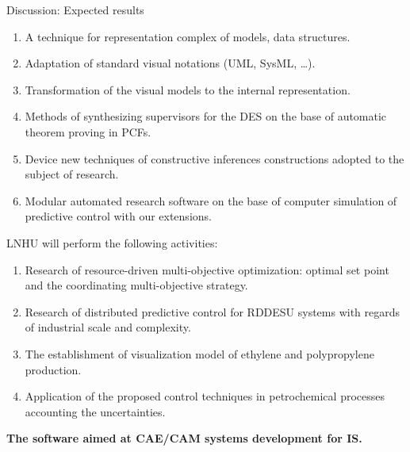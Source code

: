 \documentclass[10pt,dvipsnames]{beamer}
\begin{document}
\begin{frame}{Discussion: Expected results}
\begin{enumerate}
\item A technique for representation complex of models, data structures.
\item Adaptation of standard visual notations (UML, SysML, \ldots).
\item Transformation of the visual models to the internal representation.
\item Methods of synthesizing supervisors for the DES on the base of automatic theorem proving in PCFs.
\item Device new techniques of constructive inferences constructions adopted to the subject of research.
\item Modular automated research software on the base of computer simulation of predictive control with our extensions.
\end{enumerate}
LNHU will perform the following activities:
\begin{enumerate}
\item Research of resource-driven multi-objective optimization: optimal set point and the coordinating multi-objective strategy.
\item Research of distributed predictive control for RDDESU systems with regards of industrial scale and complexity.
\item The establishment of visualization model of ethylene and polypropylene production.
\item Application of the proposed control techniques in petrochemical processes accounting the uncertainties.
\end{enumerate}

\noindent\textbf{The software aimed at CAE/CAM systems development for IS.}
\end{frame}
\end{document}
